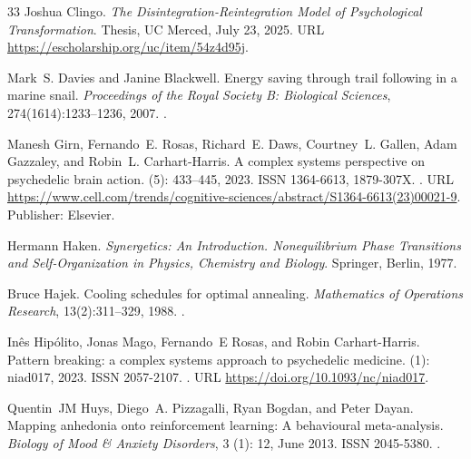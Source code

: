 \documentclass[12pt,fleqn]{article}
\begin{document}
\begin{thebibliography}{33}
  Joshua Clingo.
  \newblock \emph{The Disintegration-Reintegration Model of Psychological Transformation}.
  \newblock Thesis, UC Merced, July 23, 2025.
  \newblock URL \url{https://escholarship.org/uc/item/54z4d95j}.

  Mark~S. Davies and Janine Blackwell.
  \newblock Energy saving through trail following in a marine snail.
  \newblock \emph{Proceedings of the Royal Society B: Biological Sciences},
  274(1614):1233--1236, 2007.
  \newblock {}.

  Manesh Girn, Fernando~E. Rosas, Richard~E. Daws, Courtney~L. Gallen, Adam
  Gazzaley, and Robin~L. Carhart-Harris.
  \newblock A complex systems perspective on psychedelic brain action.
   (5): 433--445, 2023.
  \newblock ISSN 1364-6613, 1879-307X.
  \newblock {}.
  \newblock URL
  \url{https://www.cell.com/trends/cognitive-sciences/abstract/S1364-6613(23)00021-9}.
  \newblock Publisher: Elsevier.

  Hermann Haken.
  \newblock \emph{Synergetics: An Introduction. Nonequilibrium Phase Transitions
  and Self-Organization in Physics, Chemistry and Biology}.
  \newblock Springer, Berlin, 1977.

  Bruce Hajek.
  \newblock Cooling schedules for optimal annealing.
  \newblock \emph{Mathematics of Operations Research}, 13(2):311--329, 1988.
  \newblock {}.

  In\^es Hip\'olito, Jonas Mago, Fernando~E Rosas, and Robin Carhart-Harris.
  \newblock Pattern breaking: a complex systems approach to psychedelic medicine.
   (1): niad017, 2023.
  \newblock ISSN 2057-2107.
  \newblock {}.
  \newblock URL \url{https://doi.org/10.1093/nc/niad017}.

  Quentin~JM Huys, Diego~A. Pizzagalli, Ryan Bogdan, and Peter Dayan.
  \newblock Mapping anhedonia onto reinforcement learning: A behavioural
  meta-analysis.
  \newblock \emph{Biology of Mood \& Anxiety Disorders}, 3 (1):
  12, June 2013.
  \newblock ISSN 2045-5380.
  \newblock {}.


\end{thebibliography}
\end{document}
